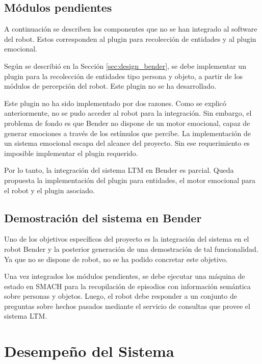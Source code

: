 \subsection{Módulos pendientes}

A continuación se describen los componentes que no se han integrado al software del robot. Estos corresponden al plugin para recolección de entidades y al plugin emocional.

 Según se describió en la Sección \ref{sec:design_bender}, se debe implementar un plugin para la recolección de entidades tipo persona y objeto, a partir de los módulos de percepción del robot. Este plugin no se ha desarrollado.

 Este plugin no ha sido implementado por dos razones. Como se explicó anteriormente, no se pudo acceder al robot para la integración. Sin embargo, el problema de fondo es que Bender no dispone de un motor emocional, capaz de generar emociones a través de los estímulos que percibe. La implementación de un sistema emocional escapa del alcance del proyecto. Sin ese requerimiento es imposible implementar el plugin requerido.


Por lo tanto, la integración del sistema LTM en Bender es parcial. Queda propuesta la implementación del plugin para entidades, el motor emocional para el robot y el plugin asociado.

\subsection{Demostración del sistema en Bender}

Uno de los objetivos específicos del proyecto es la integración del sistema en el robot Bender y la posterior generación de una demostración de tal funcionalidad. Ya que no se dispone de robot, no se ha podido concretar este objetivo. 

Una vez integrados los módulos pendientes, se debe ejecutar una máquina de estado en SMACH para la recopilación de episodios con información semántica sobre personas y objetos. Luego, el robot debe responder a un conjunto de preguntas sobre hechos pasados mediante el servicio de consultas que provee el sistema LTM.


\section{Desempeño del Sistema}

